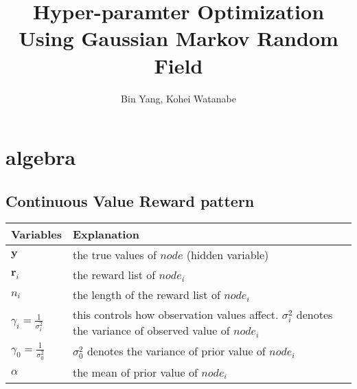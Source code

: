 \documentclass[platex, a4paper]{jsarticle}
\begin{document}
\title{Hyper-paramter Optimization \\ Using Gaussian Markov Random Field}
\author{Bin Yang, Kohei Watanabe}
\maketitle

\section{algebra}

\subsection{Continuous Value Reward pattern}

\begin{table}[htb]
\begin{tabular}{ll} \toprule
Variables & Explanation \\ \toprule
$\bm{y}$ & the true values of $node$ (hidden variable) \\
$\bm{r}_i$ & the reward list of $node_i$ \\
$n_i$ & the length of the reward list of $node_i$ \\
$\gamma_i=\frac{1}{\sigma_i^2}$ & this controls how observation values affect. $\sigma_i^2$ denotes the variance of observed value of $node_i$ \\
$\gamma_0=\frac{1}{\sigma_0^2}$ & $\sigma_0^2$ denotes the variance of prior value of $node_i$ \\
$\alpha$ & the mean of prior value of $node_i$ \\ \bottomrule
\end{tabular}
\end{table}
\end{document}
